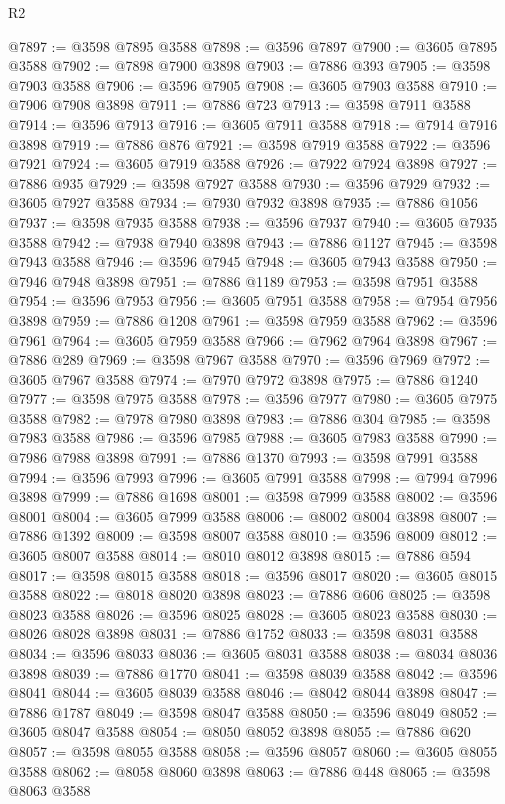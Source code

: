 \begin{lexlean}{R2}
\begin{coremodule}
@7897 := @3598 @7895 @3588
@7898 := @3596 @7897
@7900 := @3605 @7895 @3588
@7902 := @7898 @7900 @3898
@7903 := @7886 @393
@7905 := @3598 @7903 @3588
@7906 := @3596 @7905
@7908 := @3605 @7903 @3588
@7910 := @7906 @7908 @3898
@7911 := @7886 @723
@7913 := @3598 @7911 @3588
@7914 := @3596 @7913
@7916 := @3605 @7911 @3588
@7918 := @7914 @7916 @3898
@7919 := @7886 @876
@7921 := @3598 @7919 @3588
@7922 := @3596 @7921
@7924 := @3605 @7919 @3588
@7926 := @7922 @7924 @3898
@7927 := @7886 @935
@7929 := @3598 @7927 @3588
@7930 := @3596 @7929
@7932 := @3605 @7927 @3588
@7934 := @7930 @7932 @3898
@7935 := @7886 @1056
@7937 := @3598 @7935 @3588
@7938 := @3596 @7937
@7940 := @3605 @7935 @3588
@7942 := @7938 @7940 @3898
@7943 := @7886 @1127
@7945 := @3598 @7943 @3588
@7946 := @3596 @7945
@7948 := @3605 @7943 @3588
@7950 := @7946 @7948 @3898
@7951 := @7886 @1189
@7953 := @3598 @7951 @3588
@7954 := @3596 @7953
@7956 := @3605 @7951 @3588
@7958 := @7954 @7956 @3898
@7959 := @7886 @1208
@7961 := @3598 @7959 @3588
@7962 := @3596 @7961
@7964 := @3605 @7959 @3588
@7966 := @7962 @7964 @3898
@7967 := @7886 @289
@7969 := @3598 @7967 @3588
@7970 := @3596 @7969
@7972 := @3605 @7967 @3588
@7974 := @7970 @7972 @3898
@7975 := @7886 @1240
@7977 := @3598 @7975 @3588
@7978 := @3596 @7977
@7980 := @3605 @7975 @3588
@7982 := @7978 @7980 @3898
@7983 := @7886 @304
@7985 := @3598 @7983 @3588
@7986 := @3596 @7985
@7988 := @3605 @7983 @3588
@7990 := @7986 @7988 @3898
@7991 := @7886 @1370
@7993 := @3598 @7991 @3588
@7994 := @3596 @7993
@7996 := @3605 @7991 @3588
@7998 := @7994 @7996 @3898
@7999 := @7886 @1698
@8001 := @3598 @7999 @3588
@8002 := @3596 @8001
@8004 := @3605 @7999 @3588
@8006 := @8002 @8004 @3898
@8007 := @7886 @1392
@8009 := @3598 @8007 @3588
@8010 := @3596 @8009
@8012 := @3605 @8007 @3588
@8014 := @8010 @8012 @3898
@8015 := @7886 @594
@8017 := @3598 @8015 @3588
@8018 := @3596 @8017
@8020 := @3605 @8015 @3588
@8022 := @8018 @8020 @3898
@8023 := @7886 @606
@8025 := @3598 @8023 @3588
@8026 := @3596 @8025
@8028 := @3605 @8023 @3588
@8030 := @8026 @8028 @3898
@8031 := @7886 @1752
@8033 := @3598 @8031 @3588
@8034 := @3596 @8033
@8036 := @3605 @8031 @3588
@8038 := @8034 @8036 @3898
@8039 := @7886 @1770
@8041 := @3598 @8039 @3588
@8042 := @3596 @8041
@8044 := @3605 @8039 @3588
@8046 := @8042 @8044 @3898
@8047 := @7886 @1787
@8049 := @3598 @8047 @3588
@8050 := @3596 @8049
@8052 := @3605 @8047 @3588
@8054 := @8050 @8052 @3898
@8055 := @7886 @620
@8057 := @3598 @8055 @3588
@8058 := @3596 @8057
@8060 := @3605 @8055 @3588
@8062 := @8058 @8060 @3898
@8063 := @7886 @448
@8065 := @3598 @8063 @3588

\end{coremodule}
\end{lexlean}
